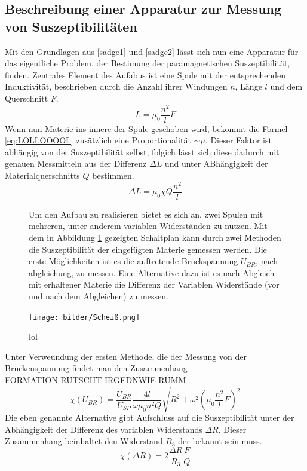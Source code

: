 \subsection{Beschreibung einer Apparatur zur Messung von Suszeptibilitäten}
Mit den Grundlagen aus \ref{sadge1} und \ref{sadge2} lässt sich nun eine Apparatur für das eigentliche Problem, der Bestimung 
der paramagnetischen Suszeptibilität, finden. 
Zentrales Element des Aufabus ist eine Spule mit der entsprechenden Induktivität, beschrieben durch die Anzahl ihrer Windungen $n$, Länge $l$
und dem Querschnitt $F$. 
\begin{equation}
    \label{eq:LOLLOOOOL}
    L = \mu_0 \frac{n^2}{l}F
\end{equation}
Wenn nun Materie ins innere der Spule geschoben wird, bekommt die Formel \eqref{eq:LOLLOOOOL} zusätzlich eine Proportionalität 
$ \sim \mu$. Dieser Faktor ist abhängig von der Suszeptibilität selbst, folgich lässt sich diese dadurch mit genauen Messmitteln aus der Differenz $\Delta L$ und unter ABhängigkeit der Materialquerschnitts $Q$
bestimmen.
\begin{equation}
    \label{eqn:werdasliestistdummXD}
    \Delta L = \mu_0 \chi Q \frac{n^2}{l}
\end{equation}
\begin{figure}
\begin{minipage}{0.5\textwidth}
Um den Aufbau zu realisieren bietet es sich an, zwei Spulen mit mehreren, unter anderem variablen Widerständen zu nutzen.
Mit dem in Abbildung \ref{fig:scheißplan} gezeigten Schaltplan kann durch zwei Methoden die Suszeptibilität der eingefügten Materie gemessen werden.
Die erste Möglichkeiten ist es die auftretende Brückspannung $U_{BR}$, nach abgleichung, zu messen. Eine Alternative dazu 
ist es nach Abgleich mit erhaltener Materie die Differenz der Variablen Widerstände (vor und nach dem Abgleichen) zu messen.
\end{minipage}
\hfill
\begin{minipage}{0.4\textwidth}
    \texttt{[image: bilder/Scheiß.png]}
    \caption{lol}
    \label{fig:scheißplan}
\end{minipage}
\end{figure}
Unter Verweundung der ersten Methode, die der Messung von der Brückenspannung findet man den Zusammenhang
\\FORMATION RUTSCHT IRGEDNWIE RUMM
\begin{equation}
    \label{eqn:werdasliestistOMEGAdummXD}
    \chi(U_{BR})= \frac{U_{BR}}{U_{SP}} \frac{4l}{\omega \mu_0 n^2 Q} \sqrt{R^2+\omega^2 \left( \mu_0 \frac{n^2}{l}F \right)^2}
\end{equation}
Die eben genannte Alternative gibt Aufschluss auf die Suszeptibilität unter der Abhängigkeit der Differenz des variablen Widerstands %
$\Delta R$. Dieser Zusammenhang beinhaltet den Widerstand $R_3$ der bekannt sein muss.
\begin{equation}
    \label{eqn:werdasliestistOMEGAundGIGAdummXD}
    \chi(\Delta R) = 2 \frac{\Delta R}{R_3}\frac{F}{Q}
\end{equation}